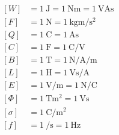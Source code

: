 
\begin{align}
\label{eq:einheit:energie}
\left[W\right] &= \SI{1}{\joule} = \SI{1}{\newton\meter} =
\SI{1}{\volt\ampere\second}\\
\label{eq:einheit:kraft}
\left[F\right] &= \SI{1}{\newton} = \SI{1}{\kilogram\meter\per\second\squared}\\
\label{eq:einheit:ladung}
\left[Q\right] &= \SI{1}{\coulomb} = \SI{1}{\ampere\second}\\
\label{eq:einheit:kapazitaet}
\left[C\right] &= \SI{1}{\farad} =
\SI{1}{\coulomb\per\volt}\\
\label{eq:einheit:magnetische:flussdichte}
\left[B\right] &= \SI{1}{\tesla} = \SI{1}{\newton\per\ampere\per\meter}\\
\label{eq:einheit:induktivitaet}
\left[L\right] &= \SI{1}{\henry} = \SI{1}{\volt\second\per\ampere}\\
\label{eq:einheit:elektrisches:feld}
\left[E\right] &= \SI{1}{\volt\per\meter} = \SI{1}{\newton\per\coulomb}\\
\label{eq:einheit:magnetischer:fluss}
\left[\Phi\right] &= \SI{1}{\tesla\meter\squared} = \SI{1}{\volt\second}\\
\label{eq:einheit:elektrische:flussdichte}
\left[\sigma\right] &= \SI{1}{\coulomb\per\meter\squared}\\
\label{eq:einheit:frequenz}
\left[f\right] &= \SI{1}{\per\second} = \SI{1}{\hertz}
\end{align}